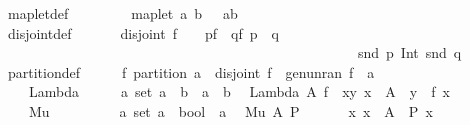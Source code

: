 \begin{isabellebody}
maplet{\isacharunderscore}def{\isacharcolon}\ \ \ \ \ \ \ \ \ {\isachardoublequoteopen}maplet\ a\ b\ \ {\isacharequal}{\isacharequal}\ {\isacharparenleft}a{\isacharcomma}b{\isacharparenright}{\isachardoublequoteclose}\isanewline
disjoint{\isacharunderscore}def{\isacharcolon}\ \ \ \ \ \ \ {\isachardoublequoteopen}disjoint\ f\ \ {\isacharequal}{\isacharequal}\ {\isacharparenleft}{\isacharbang}\ p{\isacharcolon}f{\isachardot}\ {\isacharbang}\ q{\isacharcolon}f{\isachardot}\ p\ {\isachartilde}{\isacharequal}\ q\ {\isacharminus}{\isacharminus}{\isachargreater}\ \ \isanewline
\ \ \ \ \ \ \ \ \ \ \ \ \ \ \ \ \ \ \ \ \ \ \ \ \ \ \ \ \ \ \ \ \ \ \ \ \ \ \ \ \ \ \ \ \ \ \ \ \ \ {\isacharparenleft}snd\ p{\isacharparenright}\ Int\ {\isacharparenleft}snd\ q{\isacharparenright}\ {\isacharequal}\ {\isacharbraceleft}{\isacharbraceright}{\isacharparenright}{\isachardoublequoteclose}\isanewline
partition{\isacharunderscore}def{\isacharcolon}\ \ \ \ \ \ {\isachardoublequoteopen}f\ partition\ a\ {\isacharequal}{\isacharequal}\ {\isacharparenleft}disjoint\ f\ {\isacharampersand}\ gen{\isacharunderscore}un{\isacharparenleft}ran\ f{\isacharparenright}\ {\isacharequal}\ a{\isacharparenright}{\isachardoublequoteclose}\isanewline
\isanewline
\isanewline
\isanewline
\isanewline
\isanewline
\isanewline
\isanewline
{}\isamarkupfalse%
\isanewline
\ \ \ Lambda\ \ \ \ \ {\isacharcolon}{\isacharcolon}\ {\isachardoublequoteopen}{\isacharbrackleft}{\isacharprime}a\ set{\isacharcomma}\ {\isacharprime}a\ {\isacharequal}{\isachargreater}\ {\isacharprime}b{\isacharbrackright}\ {\isacharequal}{\isachargreater}\ {\isacharprime}a\ {\isacharless}{\isacharequal}{\isachargreater}\ {\isacharprime}b{\isachardoublequoteclose}\isanewline
\ \ {\isachardoublequoteopen}Lambda\ A\ f\ {\isacharequal}{\isacharequal}\ {\isacharbraceleft}{\isacharparenleft}x{\isacharcomma}y{\isacharparenright}{\isachardot}\ x\ {\isacharcolon}\ A\ {\isacharampersand}\ y\ {\isacharequal}\ f\ x{\isacharbraceright}{\isachardoublequoteclose}\isanewline
\ \ \ Mu\ \ \ \ \ \ \ \ \ {\isacharcolon}{\isacharcolon}\ {\isachardoublequoteopen}{\isacharbrackleft}{\isacharprime}a\ set{\isacharcomma}\ {\isacharprime}a\ {\isacharequal}{\isachargreater}\ bool{\isacharbrackright}\ {\isacharequal}{\isachargreater}\ {\isacharprime}a{\isachardoublequoteclose}\isanewline
\ \ {\isachardoublequoteopen}Mu\ A\ P\ \ \ \ \ {\isacharequal}{\isacharequal}\ {\isacharat}\ x{\isachardot}\ x\ {\isacharcolon}\ A\ {\isacharampersand}\ P\ x{\isachardoublequoteclose}\ \isanewline
\isanewline
{}\isamarkupfalse%
\isanewline

\end{isabellebody}
